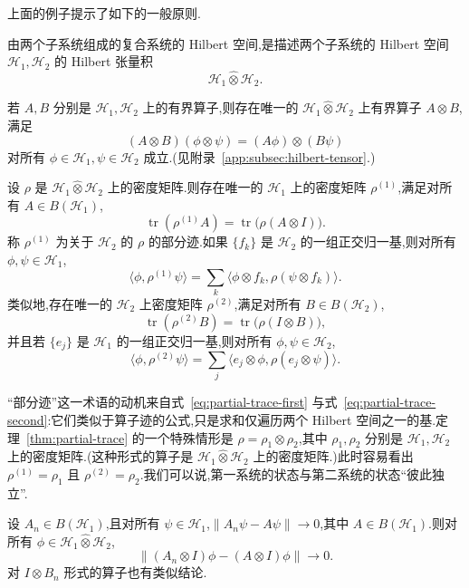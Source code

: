 上面的例子提示了如下的一般原则.

\begin{axiom}\label{ax:composite-hilbert-space}
由两个子系统组成的复合系统的 Hilbert 空间,是描述两个子系统的 Hilbert 空间 $\mathcal H_1,\mathcal H_2$ 的 Hilbert 张量积
\[
 \mathcal H_1\widehat\otimes\mathcal H_2.
\]
\end{axiom}

若 $A,B$ 分别是 $\mathcal H_1,\mathcal H_2$ 上的有界算子,则存在唯一的 $\mathcal H_1\widehat\otimes\mathcal H_2$ 上有界算子 $A\otimes B$,满足
\[
 (A\otimes B)(\phi\otimes\psi)=(A\phi)\otimes(B\psi)
\]
对所有 $\phi\in\mathcal H_1,\psi\in\mathcal H_2$ 成立.(见附录~\ref{app:subsec:hilbert-tensor}.)

\begin{theorem}[部分迹]\label{thm:partial-trace}
设 $\rho$ 是 $\mathcal H_1\widehat\otimes\mathcal H_2$ 上的密度矩阵.则存在唯一的 $\mathcal H_1$ 上的密度矩阵 $\rho^{(1)}$,满足对所有 $A\in B(\mathcal H_1)$,
\[
 \operatorname{tr}(\rho^{(1)}A)
 =\operatorname{tr}\bigl(\rho(A\otimes I)\bigr).\label{eq:partial-trace-characterization}
\]
称 $\rho^{(1)}$ 为关于 $\mathcal H_2$ 的 $\rho$ 的部分迹.如果 $\{f_k\}$ 是 $\mathcal H_2$ 的一组正交归一基,则对所有 $\phi,\psi\in\mathcal H_1$,
\[
 \langle\phi,\rho^{(1)}\psi\rangle
 =\sum_k\langle\phi\otimes f_k,\rho(\psi\otimes f_k)\rangle.\label{eq:partial-trace-first}
\]
类似地,存在唯一的 $\mathcal H_2$ 上密度矩阵 $\rho^{(2)}$,满足对所有 $B\in B(\mathcal H_2)$,
\[
 \operatorname{tr}(\rho^{(2)}B)
 =\operatorname{tr}\bigl(\rho(I\otimes B)\bigr),
\]
并且若 $\{e_j\}$ 是 $\mathcal H_1$ 的一组正交归一基,则对所有 $\phi,\psi\in\mathcal H_2$,
\[
 \langle\phi,\rho^{(2)}\psi\rangle
 =\sum_j\langle e_j\otimes\phi,\rho(e_j\otimes\psi)\rangle.\label{eq:partial-trace-second}
\]
\end{theorem}

“部分迹”这一术语的动机来自式~\eqref{eq:partial-trace-first} 与式~\eqref{eq:partial-trace-second}:它们类似于算子迹的公式,只是求和仅遍历两个 Hilbert 空间之一的基.定理~\ref{thm:partial-trace} 的一个特殊情形是 $\rho=\rho_1\otimes\rho_2$,其中 $\rho_1,\rho_2$ 分别是 $\mathcal H_1,\mathcal H_2$ 上的密度矩阵.(这种形式的算子是 $\mathcal H_1\widehat\otimes\mathcal H_2$ 上的密度矩阵.)此时容易看出 $\rho^{(1)}=\rho_1$ 且 $\rho^{(2)}=\rho_2$.我们可以说,第一系统的状态与第二系统的状态“彼此独立”.

\begin{lemma}[张量积算子的强收敛]\label{lem:tensor-product-strong-convergence}
设 $A_n\in B(\mathcal H_1)$,且对所有 $\psi\in\mathcal H_1$,$\|A_n\psi-A\psi\|\to0$,其中 $A\in B(\mathcal H_1)$.则对所有 $\phi\in\mathcal H_1\widehat\otimes\mathcal H_2$,
\[
 \|(A_n\otimes I)\phi-(A\otimes I)\phi\|\to0.
\]
对 $I\otimes B_n$ 形式的算子也有类似结论.
\end{lemma}

